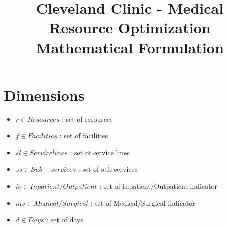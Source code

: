 \documentclass[10pt, letterpaper]{article}
\begin{document}
\title{Cleveland Clinic - Medical Resource Optimization Mathematical Formulation}
\maketitle

\section*{Dimensions}
\begin{itemize}
\item[ ] $ r \in Resources$ : set of resources
\item[ ] $ f \in Facilities$ : set of facilities
\item[ ] $ sl \in Service lines$ : set of service lines
\item[ ] $ ss \in Sub-services$ : set of sub-services
\item[ ] $ io \in Inpatient/Outpatient$ : set of Inpatient/Outpatient indicator
\item[ ] $ ms \in Medical/Surgical$ : set of Medical/Surgical indicator
\item[ ] $ d \in Days$ : set of days
\end{itemize}
\end{document}
